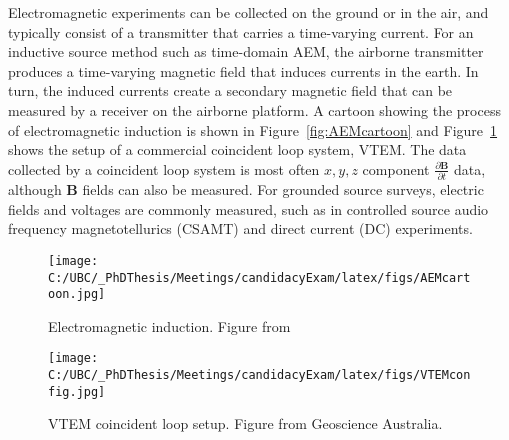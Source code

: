 \documentclass[letterpaper,11pt]{article}
\begin{document}
Electromagnetic experiments can be collected on the ground or in the air, and typically consist of a transmitter that carries a time-varying current. For an inductive source method such as time-domain AEM, the airborne transmitter produces a time-varying magnetic field that induces currents in the earth. In turn, the induced currents create a secondary magnetic field that can be measured by a receiver on the airborne platform. A cartoon showing the process of electromagnetic induction is shown in Figure~\ref{fig:AEMcartoon} \cite[]{Reynolds1998} and Figure~\ref{fig:VTEMsetup} shows the setup of a commercial coincident loop system, VTEM. The data collected by a coincident loop system is most often $ x,y,z $  component $ \frac{\partial\mathbf{B}}{\partial t} $ data, although $ \mathbf{B} $ fields can also be measured. For grounded source surveys, electric fields and voltages are commonly measured, such as in controlled source audio frequency magnetotellurics (CSAMT) \cite[]{Zonge1991} and direct current (DC) \cite[]{Inman1973} experiments. 

\begin{figure}[h]
\centering
\begin{minipage}{.5\textwidth}
  \centering
  \texttt{[image: C:/UBC/\_PhDThesis/Meetings/candidacyExam/latex/figs/AEMcartoon.jpg]}
  \caption{Electromagnetic induction. Figure from \cite{Reynolds1998}}
  \label{fig:AEMcartoon}
\end{minipage}%
\begin{minipage}{.5\textwidth}
  \centering
  \texttt{[image: C:/UBC/\_PhDThesis/Meetings/candidacyExam/latex/figs/VTEMconfig.jpg]}
  \caption{VTEM coincident loop setup. Figure from Geoscience Australia.}
  \label{fig:VTEMsetup}
\end{minipage}
\end{figure}


\end{document}
